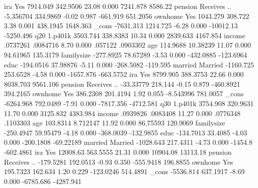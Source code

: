              {\VBAR}
         ira {\VBAR}
        Yes  {\VBAR}   7914.049   342.9506    23.08   0.000     7241.878     8586.22
             {\VBAR}
     pension {\VBAR}
Receives ..  {\VBAR}  -5.356704   334.9869    -0.02   0.987     -661.919    651.2056
             {\VBAR}
     ownhome {\VBAR}
        Yes  {\VBAR}   1043.279    308.722     3.38   0.001     438.1945    1648.363
       _cons {\VBAR}  -7631.313   1214.725    -6.28   0.000    -10012.13   -5250.496
q20          {\VBAR}
     1.p401k {\VBAR}   3503.744   338.8383    10.34   0.000     2839.633    4167.854
      income {\VBAR}   .0737261   .0084716     8.70   0.000      .057122    .0903302
         age {\VBAR}   114.9688   10.38239    11.07   0.000     94.61965    135.3179
  familysize {\VBAR}  -277.8925   78.67289    -3.53   0.000    -432.0885   -123.6964
        educ {\VBAR}  -194.0516   37.98876    -5.11   0.000    -268.5082    -119.595
             {\VBAR}
     married {\VBAR}
    Married  {\VBAR}  -1160.725   253.6528    -4.58   0.000    -1657.876   -663.5752
             {\VBAR}
         ira {\VBAR}
        Yes  {\VBAR}   8799.905   388.3753    22.66   0.000     8038.703    9561.106
             {\VBAR}
     pension {\VBAR}
Receives ..  {\VBAR}  -33.33779    218.144    -0.15   0.879    -460.8921    394.2165
             {\VBAR}
     ownhome {\VBAR}
        Yes  {\VBAR}   386.2308   201.4194     1.92   0.055    -8.543996    781.0057
       _cons {\VBAR}  -6264.968   792.0489    -7.91   0.000    -7817.356   -4712.581
q30          {\VBAR}
     1.p401k {\VBAR}   3754.908   320.9631    11.70   0.000     3125.832    4383.984
      income {\VBAR}   .0939826   .0083408    11.27   0.000     .0776348    .1103303
         age {\VBAR}   103.8314   8.712147    11.92   0.000     86.75593    120.9069
  familysize {\VBAR}  -250.4947   59.95479    -4.18   0.000    -368.0039   -132.9855
        educ {\VBAR}  -134.7013    33.4085    -4.03   0.000    -200.1808   -69.22189
             {\VBAR}
     married {\VBAR}
    Married  {\VBAR}  -1028.643   217.4311    -4.73   0.000      -1454.8   -602.4861
             {\VBAR}
         ira {\VBAR}
        Yes  {\VBAR}   12008.63   563.5555    21.31   0.000     10904.08    13113.18
             {\VBAR}
     pension {\VBAR}
Receives ..  {\VBAR}  -179.5281   192.0513    -0.93   0.350    -555.9418    196.8855
             {\VBAR}
     ownhome {\VBAR}
        Yes  {\VBAR}   195.7323    162.634     1.20   0.229    -123.0246    514.4891
       _cons {\VBAR}  -5536.814   637.1917    -8.69   0.000    -6785.686   -4287.941
